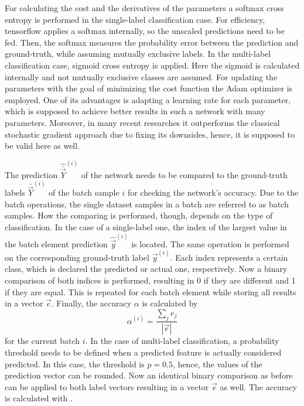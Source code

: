 For calculating the cost and the derivatives of the parameters a softmax cross entropy is performed in the single-label classification case.
For efficiency, tensorflow applies a softmax internally, so the unscaled predictions need to be fed.
Then, the softmax measures the probability error between the prediction and ground-truth, while assuming mutually exclusive labels.
In the multi-label classification case, sigmoid cross entropy is applied.
Here the sigmoid is calculated internally and not mutually exclusive classes are assumed.
For updating the parameters with the goal of minimizing the cost function the Adam optimizer is employed.
One of its advantages is adapting a learning rate for each parameter, which is supposed to achieve better results in such a network with many parameters.
Moreover, in many recent researches it outperforms the classical stochastic gradient approach due to fixing its downsides, hence, it is supposed to be valid here as well.

The prediction $\hat{\bar{\vec{Y}}}^{(i)}$ of the network needs to be compared to the ground-truth labels $\bar{\vec{Y}}^{(i)}$ of the batch sample $i$ for checking the network's accuracy.
Due to the batch operations, the single dataset samples in a batch are referred to as batch samples.
How the comparing is performed, though, depends on the type of classification.
In the case of a single-label one, the index of the largest value in the batch element prediction $\hat{\vec{y}}^{(i)}$ is located.
The same operation is performed on the corresponding ground-truth label $\vec{y}^{(i)}$.
Each index represents a certain class, which is declared the predicted or actual one, respectively.
Now a binary comparison of both indices is performed, resulting in 0 if they are different and 1 if they are equal.
This is repeated for each batch element while storing all results in a vector $\vec{e}$.
Finally, the accuracy $\alpha$ is calculated by
\begin{equation}
	\label{eq:accuracy-mean}
	\alpha^{(i)} = \frac{\sum_{j} e_j}{|\vec{e}|}
\end{equation}
for the current batch $i$.
In the case of multi-label classification, a probability threshold needs to be defined when a predicted feature is actually considered predicted.
In this case, the threshold is $p=0.5$, hence, the values of the prediction vector can be rounded.
Now an identical binary comparison as before can be applied to both label vectors resulting in a vector $\vec{e}$ as well.
The accuracy is calculated with .

